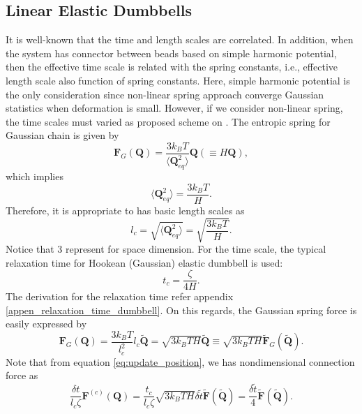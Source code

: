 \documentclass[10pt, a4paper]{article}
\begin{document}
\subsection{Linear Elastic Dumbbells}
It is well-known that the time and length scales are correlated. In addition, when the system has connector between beads based on simple harmonic potential, then the effective time scale is related with the spring constants, i.e., effective length scale also function of spring constants. 
Here, simple harmonic potential is the only consideration since non-linear spring approach converge Gaussian statistics when deformation is small. However, if we consider non-linear spring, the time scales must varied as proposed scheme on \textcite{Herrchen1997}.
The entropic spring for Gaussian chain is given by
\begin{equation}
\mathbf{F}_G(\mathbf{Q}) = \frac{3k_BT}{\langle \mathbf{Q}_{eq}^2\rangle}\mathbf{Q} \left(\equiv H\mathbf{Q}\right),
\end{equation}
which implies
\begin{equation}
\langle \mathbf{Q}_{eq}^2\rangle = \frac{3k_BT}{H}.
\end{equation}
Therefore, it is appropriate to has basic length scales as
\begin{equation}
l_c = \sqrt{\langle\mathbf{Q}_{eq}^2\rangle}=\sqrt{\frac{3k_BT}{H}}.
\end{equation}
Notice that 3 represent for space dimension.
For the time scale, the typical relaxation time for Hookean (Gaussian) elastic dumbbell is used:
\begin{equation}
t_c = \frac{\zeta}{4H}.
\end{equation}
The derivation for the relaxation time refer appendix \ref{appen_relaxation_time_dumbbell}.
On this regards, the Gaussian spring force is easily expressed by
\begin{equation}
\mathbf{F}_G(\mathbf{Q}) = \frac{3k_BT}{l_c^2}l_c\tilde{\mathbf{Q}} = \sqrt{3k_BTH}\tilde{\mathbf{Q}} \equiv \sqrt{3k_BTH}\tilde{\mathbf{F}}_G(\tilde{\mathbf{Q}}).
\end{equation}
Note that from equation \eqref{eq:update_position}, we has nondimensional connection force as
\begin{equation}
\frac{\delta t}{l_c\zeta}\mathbf{F}^{(c)}(\mathbf{Q}) = \frac{t_c}{l_c\zeta}\sqrt{3k_BTH}\delta \tilde{t}\tilde{\mathbf{F}}(\tilde{\mathbf{Q}}) = \frac{\delta \tilde{t}}{4}\tilde{\mathbf{F}}(\tilde{\mathbf{Q}}).
\end{equation}
\end{document}
